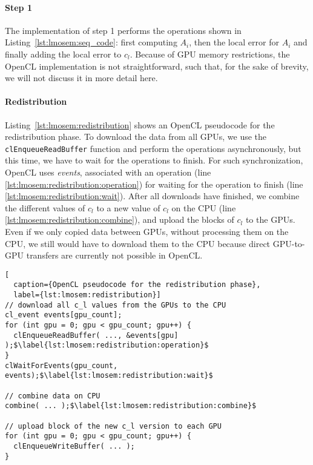 \paragraph{Step 1}
The implementation of step 1 performs the operations shown in Listing~\ref{lst:lmosem:seq_code}: first computing $A_i$, then the local error for $A_i$ and finally adding the local error to $c_l$.
Because of GPU memory restrictions, the OpenCL implementation is not straightforward, such that, for the sake of brevity, we will not discuss it in more detail here.

\paragraph{Redistribution}
Listing~\ref{lst:lmosem:redistribution} shows an OpenCL pseudocode for the redistribution phase.
To download the data from all GPUs, we use the \texttt{clEnqueueReadBuffer} function and perform the operations asynchronously, but this time, we have to wait for the operations to finish.
For such synchronization, OpenCL uses \emph{events}, associated with an operation (line \ref{lst:lmosem:redistribution:operation}) for waiting for the operation to finish (line \ref{lst:lmosem:redistribution:wait}).
After all downloads have finished, we combine the different values of $c_l$ to a new value of $c_l$ on the CPU (line \ref{lst:lmosem:redistribution:combine}), and upload the blocks of $c_l$ to the GPUs.
Even if we only copied data between GPUs, without processing them on the CPU, we still would have to download them to the CPU because direct GPU-to-GPU transfers are currently not possible in OpenCL.

\begin{lstlisting}[
  caption={OpenCL pseudocode for the redistribution phase},
  label={lst:lmosem:redistribution}]
// download all c_l values from the GPUs to the CPU
cl_event events[gpu_count];
for (int gpu = 0; gpu < gpu_count; gpu++) {
  clEnqueueReadBuffer( ..., &events[gpu] );$\label{lst:lmosem:redistribution:operation}$
}
clWaitForEvents(gpu_count, events);$\label{lst:lmosem:redistribution:wait}$

// combine data on CPU
combine( ... );$\label{lst:lmosem:redistribution:combine}$

// upload block of the new c_l version to each GPU
for (int gpu = 0; gpu < gpu_count; gpu++) {
  clEnqueueWriteBuffer( ... );
}
\end{lstlisting}

